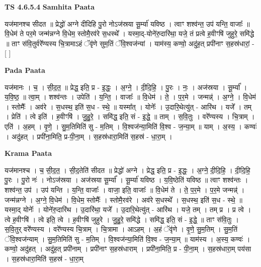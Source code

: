\documentclass[17pt]{extarticle}
\begin{document}
\textbf{TS 4.6.5.4 } \newline
\textbf{Samhita Paata} \newline

यज॑मानश्च सीदत ॥ प्रेद्धो॑ अग्ने दीदिहि पु॒रो नोऽज॑स्रया सू॒र्म्या॑ यविष्ठ । त्वाꣳ शश्व॑न्त॒ उप॑ यन्ति॒ वाजाः᳚ ॥ वि॒धेम॑ ते पर॒मे जन्म॑न्नग्ने वि॒धेम॒ स्तोमै॒रव॑रे स॒धस्थे᳚ । यस्मा॒द्-योने॑रु॒दारि॑था॒ यजे॒ तं प्रत्वे ह॒वीꣳषि॑ जुहुरे॒ समि॑द्धे ॥ ताꣳ स॑वि॒तुर्वरे᳚ण्यस्य चि॒त्रामाऽहं ॅवृ॑णे सुम॒तिं ॅवि॒श्वज॑न्यां । याम॑स्य॒ कण्वो॒ अदु॑ह॒त् प्रपी॑नाꣳ स॒हस्र॑धारां॒ - [  ] \newline

\textbf{Pada Paata} \newline

यज॑मानः । च॒ । सी॒द॒त॒ ॥ प्रेद्ध॒ इति॒ प्र - इ॒द्धः॒ । अ॒ग्ने॒ । दी॒दि॒हि॒ । पु॒रः । नः॒ । अज॑स्रया । सू॒र्म्या᳚ । य॒वि॒ष्ठ॒ ॥ त्वा॒म् । शश्व॑न्तः । उपेति॑ । य॒न्ति॒ । वाजाः᳚ ॥ वि॒धेम॑ । ते॒ । प॒र॒मे । जन्मन्न्॑ । अ॒ग्ने॒ । वि॒धेम॑ । स्तोमैः᳚ । अव॑रे । स॒धस्थ॒ इति॑ स॒ध - स्थे॒ ॥ यस्मा᳚त् । योनेः᳚ । उ॒दारि॒थेत्यु॑त् - आरि॑थ । यजे᳚ । तम् । प्रेति॑ । त्वे इति॑ । ह॒वीꣳषि॑ । जु॒हु॒रे॒ । समि॑द्ध॒ इति॒ सं - इ॒द्धे॒ ॥ ताम् । स॒वि॒तुः । वरे᳚ण्यस्य । चि॒त्राम् । एति॑ । अ॒हम् । वृ॒णे॒ । सु॒म॒तिमिति॑ सु - म॒तिम् । वि॒श्वज॑न्या॒मिति॑ वि॒श्व - ज॒न्या॒म् ॥ याम् । अ॒स्य॒ । कण्वः॑ । अदु॑हत् । प्रपी॑ना॒मिति॒ प्र-पी॒ना॒म् । स॒हस्र॑धारा॒मिति॑ स॒हस्र॑ - धा॒रा॒म् ।  \newline


\textbf{Krama Paata} \newline

यज॑मानश्च । च॒ सी॒द॒त॒ । सी॒द॒तेति॑ सीदत ॥ प्रेद्धो॑ अग्ने । प्रेद्ध॒ इति॒ प्र - इ॒द्धः॒ । अ॒ग्ने॒ दी॒दि॒हि॒ । दी॒दि॒हि॒ पु॒रः । पु॒रो नः॑ । नोऽज॑स्रया । अज॑स्रया सू॒र्म्या᳚ । सू॒र्म्या॑ यविष्ठ । य॒वि॒ष्ठेति॑ यविष्ठ ॥ त्वाꣳ शश्व॑न्तः । शश्व॑न्त॒ उप॑ । उप॑ यन्ति । य॒न्ति॒ वाजाः᳚ । वाजा॒ इति॒ वाजाः᳚ ॥ वि॒धेम॑ ते । ते॒ प॒र॒मे । प॒र॒मे जन्मन्न्॑ । जन्म॑न्नग्ने । अ॒ग्ने॒ वि॒धेम॑ । वि॒धेम॒ स्तोमैः᳚ । स्तोमै॒रव॑रे । अव॑रे स॒धस्थे᳚ । स॒धस्थ॒ इति॑ स॒ध - स्थे॒ ॥ यस्मा॒द् योनेः᳚ । योने॑रु॒दारि॑थ । उ॒दारि॑था॒ यजे᳚ । उ॒दारि॒थेत्यु॑त् - आरि॑थ । यजे॒ तम् । तम् प्र । प्र त्वे । त्वे ह॒वीꣳषि॑ । त्वे इति॒ त्वे । ह॒वीꣳषि॑ जुहुरे । जु॒हु॒रे॒ समि॑द्धे । समि॑द्ध॒ इति॒ सं - इ॒द्धे॒ ॥ ताꣳ स॑वि॒तुः । स॒वि॒तुर् वरे᳚ण्यस्य । वरे᳚ण्यस्य चि॒त्राम् । चि॒त्रामा । आऽहम् । अ॒हं ॅवृ॑णे । वृ॒णे॒ सु॒म॒तिम् । सु॒म॒तिं ॅवि॒श्वज॑न्याम् । सु॒म॒तिमिति॑ सु - म॒तिम् । वि॒श्वज॑न्या॒मिति॑ वि॒श्व - ज॒न्या॒म् ॥ याम॑स्य । अ॒स्य॒ कण्वः॑ । कण्वो॒ अदु॑हत् । अदु॑ह॒त् प्रपी॑नाम् । प्रपी॑नाꣳ स॒हस्र॑धाराम् । प्रपी॑ना॒मिति॒ प्र - पी॒ना॒म् । स॒हस्र॑धारा॒म् पय॑सा । स॒हस्र॑धारा॒मिति॑ स॒हस्र॑ - धा॒रा॒म् \newline
\end{document}
